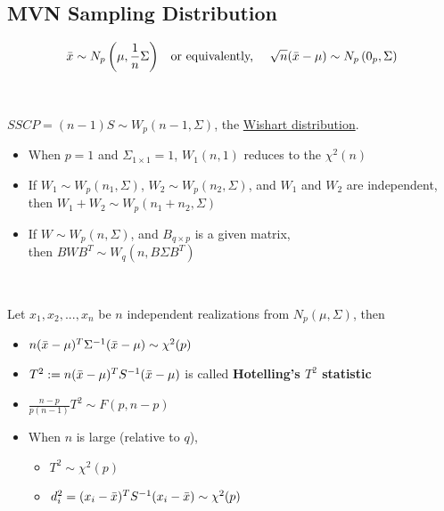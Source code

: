 \documentclass[12pt]{extarticle}
\newcommand{\<}{\langle}
\renewcommand{\>}{\rangle}
\theoremstyle{definition}
\begin{document}
\subsection{MVN Sampling Distribution}
\begin{tcolorbox}[enhanced, drop fuzzy shadow, title=Distribution of Mean Vector]
\begin{align*}
    \Bar{x} \sim N_p\left(\mu, \frac{1}{n}\Sigma \right) && \text{or equivalently, } && \sqrt{n}(\Bar{x}-\mu) \sim N_p \left(0_p, \Sigma \right)
\end{align*}
\end{tcolorbox}
\ \\
\begin{tcolorbox}[enhanced, drop fuzzy shadow, title=Whishart Distribution]
$SSCP = (n-1)S \sim W_p(n-1, \Sigma)$, the \underline{Wishart distribution}.
\begin{itemize}
    \item When $p=1$ and $\Sigma_{1 \times 1}=1$, $W_1(n,1)$ reduces to the $\chi^2 (n)$ \\
    \item If $W_1 \sim W_p(n_1, \Sigma)$, $W_2 \sim W_p(n_2, \Sigma)$, and $W_1$ and $W_2$ are independent, \\
    then $W_1 + W_2 \sim W_p(n_1 + n_2, \Sigma)$ \\
    \item If $W \sim W_p(n,\Sigma)$, and $B_{q \times p}$ is a given matrix, \\
    then $BWB^T \sim W_q (n, B\Sigma B^T)$
\end{itemize}
\end{tcolorbox}
\ \\
\begin{tcolorbox}[enhanced, drop fuzzy shadow, title=Hotelling's $T^2$]
Let $x_1, x_2, ..., x_n$ be $n$ independent realizations from $N_p(\mu, \Sigma)$, then
\begin{itemize}
    \item $n(\Bar{x}-\mu)^T \Sigma^{-1} (\Bar{x}-\mu) \sim \chi^2 (p)$ \\
    \item $T^2 := n(\Bar{x}-\mu)^T S^{-1} (\Bar{x}-\mu)$ is called \textbf{Hotelling's $T^2$ statistic} \\
    \item $\frac{n-p}{p(n-1)} T^2 \sim F(p, n-p)$ \\
    \item When $n$ is large (relative to $q$),
    \begin{itemize}
        \item $T^2 \sim \chi^2 (p)$ \\
        \item $d_i^2 = (x_i - \Bar{x})^T S^{-1} (x_i - \Bar{x}) \sim \chi^2 (p)$
    \end{itemize}
\end{itemize}
\end{tcolorbox}
\end{document}
